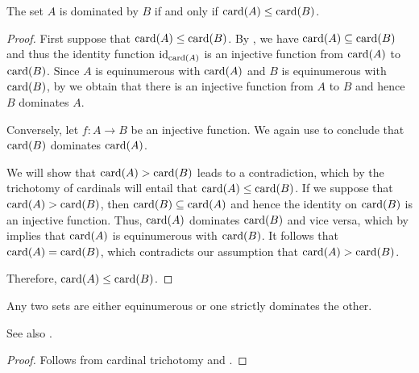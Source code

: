 \begin{proposition}\label{thm:cardinality_order_compatibility}
  The set \( A \) is dominated by \( B \) if and only if \( \operatorname{card}(A) \leq \operatorname{card}(B) \).
\end{proposition}
\begin{proof}
  \SufficiencySubProof First suppose that \( \operatorname{card}(A) \leq \operatorname{card}(B) \). By , we have \( \operatorname{card}(A) \subseteq \operatorname{card}(B) \) and thus the identity function \( \operatorname{id}_{\operatorname{card}(A)} \) is an injective function from \( \operatorname{card}(A) \) to \( \operatorname{card}(B) \). Since \( A \) is equinumerous with \( \operatorname{card}(A) \) and \( B \) is equinumerous with \( \operatorname{card}(B) \), by  we obtain that there is an injective function from \( A \) to \( B \) and hence \( B \) dominates \( A \).

  \NecessitySubProof Conversely, let \( f: A \to B \) be an injective function. We again use  to conclude that \( \operatorname{card}(B) \) dominates \( \operatorname{card}(A) \).

  We will show that \( \operatorname{card}(A) > \operatorname{card}(B) \) leads to a contradiction, which by the trichotomy of cardinals will entail that \( \operatorname{card}(A) \leq \operatorname{card}(B) \). If we suppose that \( \operatorname{card}(A) > \operatorname{card}(B) \), then \( \operatorname{card}(B) \subseteq \operatorname{card}(A) \) and hence the identity on \( \operatorname{card}(B) \) is an injective function. Thus, \( \operatorname{card}(A) \) dominates \( \operatorname{card}(B) \) and vice versa, which by  implies that \( \operatorname{card}(A) \) is equinumerous with \( \operatorname{card}(B) \). It follows that \( \operatorname{card}(A) = \operatorname{card}(B) \), which contradicts our assumption that \( \operatorname{card}(A) > \operatorname{card}(B) \).

  Therefore, \( \operatorname{card}(A) \leq \operatorname{card}(B) \).
\end{proof}

\begin{corollary}\label{thm:set_domination_relation_trichotomy}
  Any two sets are either equinumerous or one strictly dominates the other.

  See also .
\end{corollary}
\begin{proof}
  Follows from cardinal trichotomy and .
\end{proof}

